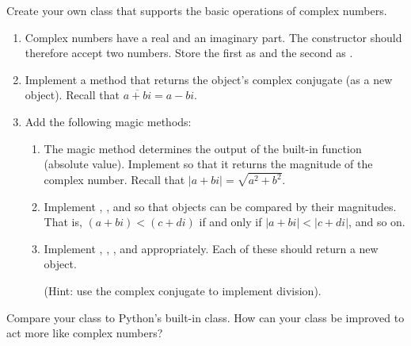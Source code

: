 \begin{problem}
Create your own  class that supports the basic operations of complex numbers.
\begin{enumerate}
\item Complex numbers have a real and an imaginary part. The constructor should therefore accept two numbers. Store the first as  and the second as .
\item Implement a  method that returns the object's complex conjugate (as a new  object). Recall that $\overline{a + bi} = a - bi$.
\item Add the following magic methods:
\begin{enumerate}
\item The  magic method determines the output of the built-in  function (absolute value). Implement  so that it returns the magnitude of the complex number. Recall that $|a+bi| = \sqrt{a^2+b^2}$.
\item Implement , , and  so that  objects can be compared by their magnitudes. That is, $(a+bi) < (c+di)$ if and only if $|a+bi| < |c+di|$, and so on.
\item Implement , , , and  appropriately.
Each of these should return a new  object.

(Hint: use the complex conjugate to implement division).
\end{enumerate}
\end{enumerate}
Compare your class to Python's built-in  class.
How can your class be improved to act more like complex numbers?
\end{problem}

